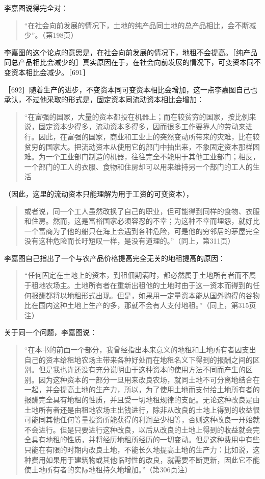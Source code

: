 李嘉图说得完全对：

\begin{quote}{“在社会向前发展的情况下，土地的纯产品同土地的总产品相比，会不断减少”。（第198页）}\end{quote}

李嘉图的这个论点的意思是，在社会向前发展的情况下，地租不会提高。［纯产品同总产品相比会减少的］真实原因在于，在社会向前发展的情况下，可变资本同不变资本相比会减少。［691］

［692］随着生产的进步，不变资本同可变资本相比会增加，这一点李嘉图自己也承认，不过他采取的形式是，固定资本同流动资本相比会增加：

\begin{quote}{“在富强的国家，大量的资本都投在机器上；而在较贫穷的国家，按比例来说，固定资本少得多，流动资本多得多，因而很多工作要靠人的劳动来进行。因此，在富强的国家，商业和工业上的突然变动所带来的灾难，比在较贫穷的国家大。把流动资本从使用它的部门中抽出来，不象固定资本那样困难。为一个工业部门制造的机器，往往完全不能用于其他工业部门；相反，一个部门的工人的衣服、食物和住房却可以用来维持另一个部门的工人的生活}\end{quote}

（因此，这里的流动资本只能理解为用于工资的可变资本），

\begin{quote}{或者说，同一个工人虽然改换了自己的职业，但可能得到同样的食物、衣服和住房。然而，这是富裕国家必须容忍的不幸；为这种不幸而埋怨，就好比一个富商为了他的船只在海上会遇到各种危险，可是他的穷邻居的茅屋完全没有这种危险而长吁短叹一样，是没有道理的。”（同上，第311页）}\end{quote}

李嘉图自己指出了一个与农产品价格提高完全无关的地租提高的原因：

\begin{quote}{“任何固定在土地上的资本，到租佃期满时，都必然属于土地所有者而不属于租地农场主。土地所有者在重新出租他的土地时由于这一资本而得到的任何报酬都将以地租形式出现。但是，如果用一定量资本能从国外购得的谷物比在国内这种土地上生产的多，那就不会有人支付地租。”（同上，第315页注）}\end{quote}

关于同一个问题，李嘉图说：

\begin{quote}{“在本书的前面一个部分，我曾经指出本来意义的地租和土地所有者因支出自己的资本给租地农场主带来各种好处而在地租名义下得到的报酬之间的区别。但是我也许还没有充分说明由于这种资本的使用方法不同而产生的区别。因为这种资本的一部分一旦用来改良农场，就同土地不可分离地结合在一起，并会提高土地的生产力，所以，为了使用土地而支付给土地所有者的报酬完全具有地租的性质，并且受一切地租规律的支配。无论这种改良是由土地所有者还是由租地农场主出钱进行，除非从改良的土地上得到的收益很可能同其他任何等量投资所能获得的利润至少相等，否则这种改良一开始就不会进行。但是只要进行这种改良，以后从改良的土地上得到的收益就会完全具有地租的性质，并将经历地租所经历的一切变动。但是这种费用中有些只能在有限的时期内改良土地，不能长久地提高土地的生产力：比如说，这种费用如果用于建筑物或其他临时性的改良，就需要不断更新，因此它不能使土地所有者的实际地租持久地增加。”（第306页注）}\end{quote}

